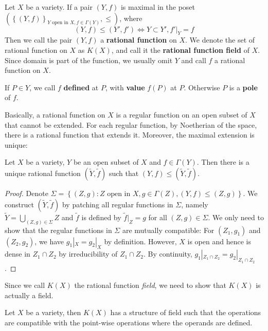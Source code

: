 \documentclass{note-eng}
\begin{document}
\begin{definition}
    Let $X$ be a variety. If a pair $(Y, f)$ is maximal in the poset $(\left\lbrace (Y, f) \right\rbrace_{Y \text{ open in } X, f \in \Gamma(Y)}, \le)$, where
    $$(Y, f) \le (Y', f') \Leftrightarrow Y \subset Y', f'|_Y = f$$
    Then we call the pair $(Y, f)$ a \textbf{rational function} on $X$. We denote the set of rational function on $X$ as $K(X)$, and call it the \textbf{rational function field} of $X$. Since domain is part of the function, we usually omit $Y$ and call $f$ a rational function on $X$.

    If $P \in Y$, we call $f$ \textbf{defined} at $P$, with \textbf{value} $f(P)$ at $P$. Otherwise $P$ is a \textbf{pole} of $f$.
\end{definition}

Basically, a rational function on $X$ is a regular function on an open subset of $X$ that cannot be extended. For each regular function, by Noetherian of the space, there is a rational function that extends it. Moreover, the maximal extension is unique:

\begin{proposition}\label{prop:unique-rational}
    Let $X$ be a variety, $Y$ be an open subset of $X$ and $f \in \Gamma(Y)$. Then there is a unique rational function $(\tilde{Y}, \tilde{f})$ such that $(Y, f) \le (\tilde{Y}, \tilde{f})$.
\end{proposition}

\begin{proof}
    Denote $\Sigma = \left\lbrace (Z, g): Z \text{ open in } X, g \in \Gamma(Z), (Y, f) \le (Z, g) \right\rbrace$. We construct $(\tilde{Y}, \tilde{f})$ by patching all regular functions in $\Sigma$, namely $\tilde{Y} = \bigcup\limits_{(Z, g) \in \Sigma} Z$ and $\tilde{f}$ is defined by $\tilde{f}|_Z = g$ for all $(Z, g) \in \Sigma$. We only need to show that the regular functions in $\Sigma$ are mutually compatible: For $(Z_1, g_1)$ and $(Z_2, g_2)$, we have $g_1|_X = g_2|_X$ by definition. However, $X$ is open and hence is dense in $Z_1 \cap Z_2$ by irreducibility of $Z_1 \cap Z_2$. By continuity, $g_1|_{Z_1 \cap Z_2} = g_2|_{Z_1 \cap Z_2}$.
\end{proof}

Since we call $K(X)$ the rational function \textit{field}, we need to show that $K(X)$ is actually a field.

\begin{proposition}
    Let $X$ be a variety, then $K(X)$ has a structure of field such that the operations are compatible with the point-wise operations where the operands are defined.
\end{proposition}
\end{document}
